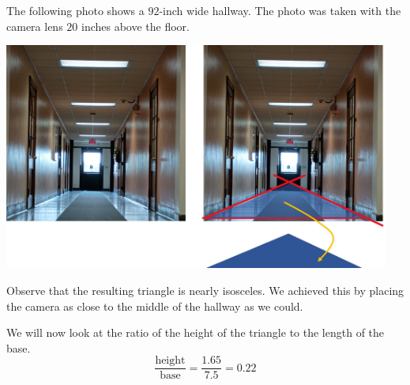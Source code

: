 \documentclass{ximera}
\begin{document}
\begin{exploration}\label{exp:hallway}



The following photo shows a $92$-inch wide hallway.  The photo was taken with the camera lens $20$ inches above the floor.

\begin{image}
         \includegraphics[width=5in]{hallwayExp.jpg}
\end{image}


Observe that the resulting triangle is nearly isosceles.  We achieved this by placing the camera as close to the middle of the hallway as we could.  

We will now look at the ratio of the height of the triangle to the length of the base.
$$\frac{\text{height}}{\text{base}}=\frac{1.65}{7.5}=0.22$$


\end{exploration}
\end{document}
